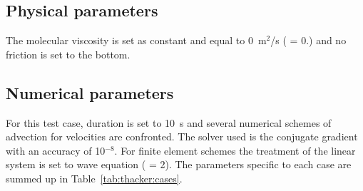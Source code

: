\subsection{Physical parameters}


The molecular viscosity is set as constant and equal to 0~m$^2$/s
( = 0.) and no friction is set to the bottom.

\subsection{Numerical parameters}

For this test case, duration is set to 10~s and several numerical schemes of
advection for velocities are confronted.
The solver used is the conjugate gradient with an accuracy of 10$^{-8}$.
For finite element schemes the treatment of the linear system is set to wave
equation ( = 2).
The parameters specific to each case are summed up in
Table~\ref{tab:thacker:cases}.

\begin{table}[H]
  \caption{List of the simulation parameters used for the seven cases tested in the Thacker example.}
  \label{tab:thacker:cases}
\end{table}

